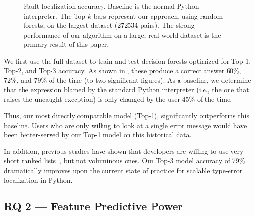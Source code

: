 \documentclass[conference]{IEEEtran}
\begin{document}
\begin{figure}
\caption{Fault localization accuracy.
Baseline is the normal Python interpreter. The Top-$k$ bars represent
our approach, using random forests,
on the largest dataset (272534 pairs). The strong performance of our
algorithm on a large, real-world dataset is the primary result of this paper.
}
\label{fig-full-dataset-acc-random-forest}
\end{figure}

We first use the full dataset to train and test decision forests optimized for
Top-1, Top-2, and Top-3 accuracy. As shown in ,
these produce a correct answer 60\%, 72\%, and
79\% of the time (to two significant figures). As a baseline, we determine that
the expression blamed by the standard Python interpreter (i.e., the one that
raises the uncaught exception) is only changed by the user 45\% of the
time.

Thus, our most directly comparable model (Top-1), significantly outperforms
this baseline. Users who are only willing to look at a single error message
would have been better-served by our Top-1 model on this historical data.

In addition, previous studies have shown that developers are willing to use
very short ranked lists~\cite[Sec.~5.6]{orso-parnin}, but not voluminous
ones. Our Top-3 model accuracy of 79\% dramatically improves upon the
current state of practice for scalable type-error localization in Python.


\subsection{RQ 2 --- Feature Predictive Power}
\end{document}
